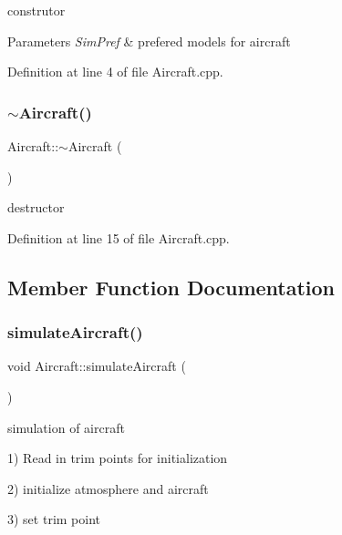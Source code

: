 construtor 


\begin{DoxyParams}{Parameters}
{\em Sim\+Pref} & prefered models for aircraft \\
\hline
\end{DoxyParams}


Definition at line 4 of file Aircraft.\+cpp.

\mbox{\label{class_aircraft_aafd3e0af1c6b0b376d3da898d16a4ad1}} 
\subsubsection{\texorpdfstring{$\sim$\+Aircraft()}{~Aircraft()}}
{\footnotesize\ttfamily Aircraft\+::$\sim$\+Aircraft (\begin{DoxyParamCaption}{ }\end{DoxyParamCaption})}



destructor 



Definition at line 15 of file Aircraft.\+cpp.



\subsection{Member Function Documentation}
\mbox{\label{class_aircraft_afc4b47817c55b981e41c7e6cecdb80df}} 
\subsubsection{\texorpdfstring{simulate\+Aircraft()}{simulateAircraft()}}
{\footnotesize\ttfamily void Aircraft\+::simulate\+Aircraft (\begin{DoxyParamCaption}{ }\end{DoxyParamCaption})}



simulation of aircraft 

1) Read in trim points for initialization

2) initialize atmosphere and aircraft

3) set trim point

